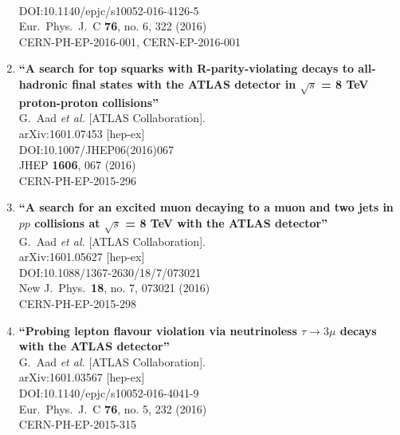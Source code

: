 \documentclass{article}
\begin{document}
\begin{enumerate}
  \\{}DOI:10.1140/epjc/s10052-016-4126-5
  \\{}Eur.\ Phys.\ J.\ C {\bf 76}, no. 6, 322 (2016)
  \\{}CERN-PH-EP-2016-001, CERN-EP-2016-001
\item%
{\bf ``A search for top squarks with R-parity-violating decays to all-hadronic final states with the ATLAS detector in $\sqrt{s}$ = 8 TeV proton-proton collisions''}
  \\{}G.~Aad {\it et al.} [ATLAS Collaboration].
  \\{}arXiv:1601.07453 [hep-ex]
  \\{}DOI:10.1007/JHEP06(2016)067
  \\{}JHEP {\bf 1606}, 067 (2016)
  \\{}CERN-PH-EP-2015-296
\item%
{\bf ``A search for an excited muon decaying to a muon and two jets in $pp$ collisions at $\sqrt{s}$ = 8 TeV with the ATLAS detector''}
  \\{}G.~Aad {\it et al.} [ATLAS Collaboration].
  \\{}arXiv:1601.05627 [hep-ex]
  \\{}DOI:10.1088/1367-2630/18/7/073021
  \\{}New J.\ Phys.\  {\bf 18}, no. 7, 073021 (2016)
  \\{}CERN-PH-EP-2015-298
\item%
{\bf ``Probing lepton flavour violation via neutrinoless $\tau \longrightarrow 3\mu$ decays with the ATLAS detector''}
  \\{}G.~Aad {\it et al.} [ATLAS Collaboration].
  \\{}arXiv:1601.03567 [hep-ex]
  \\{}DOI:10.1140/epjc/s10052-016-4041-9
  \\{}Eur.\ Phys.\ J.\ C {\bf 76}, no. 5, 232 (2016)
  \\{}CERN-PH-EP-2015-315

\end{enumerate}
\end{document}
